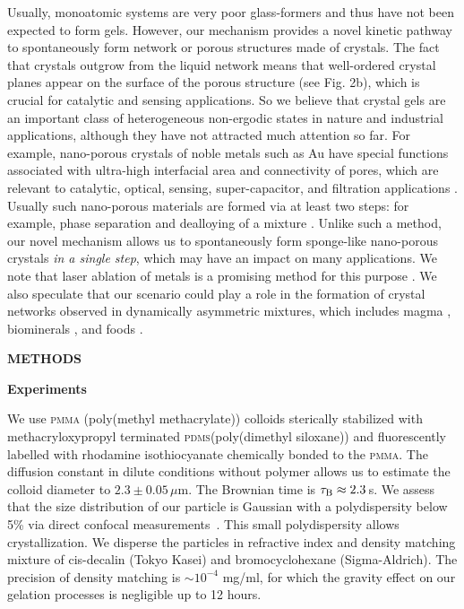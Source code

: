 \documentclass[preprint,amsmath,amssymb,superscriptaddress]{revtex4-1}
\begin{document}
Usually, monoatomic systems are very poor glass-formers and thus have not been expected to form gels. 
However, our mechanism provides a novel kinetic pathway to spontaneously form network or porous structures made of crystals.  The fact that crystals outgrow from the liquid network means that well-ordered crystal planes appear on the surface of the porous structure (see Fig. 2b), which is crucial for catalytic and sensing applications. So we believe that crystal gels are an important class of heterogeneous non-ergodic states in nature 
and industrial applications, although they have not attracted much attention so far.  
For example, nano-porous crystals of noble metals such as Au have special functions associated with ultra-high interfacial area and connectivity of pores, which are relevant to catalytic, optical, sensing, super-capacitor, and filtration applications 
\cite{ding2004nanoporous, ding2009nanoporous, wittstock2010nanoporous,fujita2012atomic}. Usually such nano-porous materials are formed via at least two steps: for example, phase separation and dealloying of a mixture
\cite{erlebacher2001evolution}. Unlike such a method, our novel mechanism allows us to spontaneously form sponge-like nano-porous crystals \emph{in a single step}, 
which may have an impact on many applications. 
We note that laser ablation of metals is a promising method for this purpose \cite{povarnitsyn2013mechanisms}.
We also speculate that our scenario could play a role in the formation of crystal networks observed in dynamically asymmetric mixtures, 
which includes magma \cite{philpotts1998role}, biominerals \cite{rousseau2005multiscale}, and foods \cite{deman1987fat}. 

\vspace{1cm}
\noindent
{\bf METHODS}

\noindent
{\bf Experiments}

We use \textsc{pmma} (poly(methyl methacrylate)) colloids sterically stabilized with methacryloxypropyl terminated \textsc{pdms}(poly(dimethyl siloxane)) and fluorescently labelled with rhodamine isothiocyanate chemically bonded to the \textsc{pmma}.
The diffusion constant in dilute conditions without polymer allows us to estimate the colloid diameter to $2.3\pm 0.05\, \mu$m. The Brownian time is $\tau_{\rm B} \approx 2.3\,$s. 
We assess that the size distribution of our particle is Gaussian with a polydispersity below 5\% via direct confocal measurements~\cite{Leocmach2013}.
This small polydispersity allows crystallization.
We disperse the particles in refractive index and density matching mixture of cis-decalin (Tokyo Kasei) and bromocyclohexane (Sigma-Aldrich). 
The precision of density matching is $\sim 10^{-4}$ mg/ml, for which the gravity effect on our gelation processes is negligible up to 12 hours.
\end{document}
